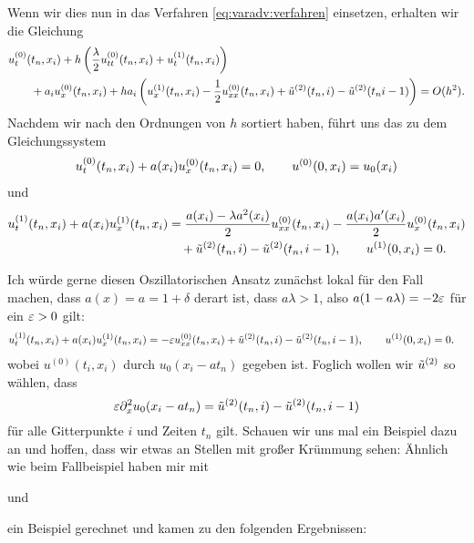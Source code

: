 Wenn wir dies nun in das Verfahren \eqref{eq:varadv:verfahren} einsetzen, erhalten wir die Gleichung
\begin{align*}
&u^{(0)}_t (t_n, x_i) + h \left( \frac \lambda 2 u^{(0)}_{tt}(t_n, x_i) + u^{(1)}_t(t_n, x_i) \right)\\ 
&\qquad +  a_i u^{(0)}_x(t_n, x_i) + h a_i \left( u^{(1)}_x(t_n, x_i) - \frac 12 u^{(0)}_{xx}(t_n, x_i)
        + \tilde u^{(2)}(t_n, i) - \tilde u^{(2)}(t_ni-1) \right) = O(h^2).
\end{align*}
Nachdem wir nach den Ordnungen von $h$ sortiert haben, führt uns das zu dem Gleichungssystem
\begin{align*}
u^{(0)}_t(t_n, x_i) + a(x_i) u^{(0)}_x(t_n, x_i) = 0, \qquad u^{(0)}(0, x_i) = u_0(x_i)
\end{align*}
und 
\begin{align*}
u^{(1)}_t(t_n, x_i) + a(x_i) u^{(1)}_x(t_n, x_i) &= \frac {a(x_i) - \lambda a^2(x_i)}{2} u^{(0)}_{xx}(t_n,x_i) - \frac{a(x_i) a'(x_i)}{2} u^{(0)}_x(t_n,x_i)\\
& \quad + \tilde u^{(2)}(t_n, i) - \tilde u^{(2)}(t_n, i-1), \qquad u^{(1)}(0, x_i) = 0.
\end{align*}

Ich würde gerne diesen Oszillatorischen Ansatz zunächst lokal für den Fall machen, dass $a(x) = a = 1+\delta$ derart ist, dass $a\lambda > 1$, also $a (1 - a\lambda) = - 2\varepsilon$ für ein $\varepsilon > 0$ gilt:
\begin{align*}
u^{(1)}_t(t_n, x_i) + a(x_i) u^{(1)}_x(t_n, x_i)
&= - \varepsilon u^{(0)}_{xx}(t_n,x_i) + \tilde u^{(2)}(t_n, i) - \tilde u^{(2)}(t_n, i-1), \qquad u^{(1)}(0, x_i) = 0.
\end{align*}
wobei $u^{(0)}(t_i, x_i)$ durch $u_0(x_i - a t_n)$ gegeben ist.
Foglich wollen wir $\tilde u^{(2)}$ so wählen, dass \[ \varepsilon \partial^2_x u_0(x_i-at_n) = \tilde u^{(2)}(t_n, i) - \tilde u^{(2)}(t_n, i-1) \] für alle Gitterpunkte $i$ und Zeiten $t_n$ gilt.
Schauen wir uns mal ein Beispiel dazu an und hoffen, dass wir etwas an Stellen mit großer Krümmung sehen:
Ähnlich wie beim Fallbeispiel haben mir mit 

und

ein Beispiel gerechnet und kamen zu den folgenden Ergebnissen:

